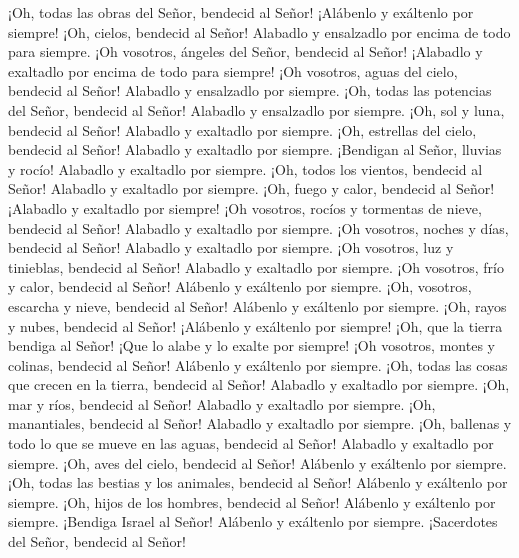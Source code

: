  ¡Oh, todas las obras del Señor, bendecid al Señor!
¡Alábenlo y exáltenlo por siempre!  ¡Oh, cielos, bendecid
al Señor! Alabadlo y ensalzadlo por encima de todo para siempre.
 ¡Oh vosotros, ángeles del Señor, bendecid al Señor!
¡Alabadlo y exaltadlo por encima de todo para siempre! 
¡Oh vosotros, aguas del cielo, bendecid al Señor! Alabadlo y ensalzadlo
por siempre.  ¡Oh, todas las potencias del Señor,
bendecid al Señor! Alabadlo y ensalzadlo por siempre. 
¡Oh, sol y luna, bendecid al Señor! Alabadlo y exaltadlo por siempre.
 ¡Oh, estrellas del cielo, bendecid al Señor! Alabadlo y
exaltadlo por siempre.  ¡Bendigan al Señor, lluvias y
rocío! Alabadlo y exaltadlo por siempre.  ¡Oh, todos los
vientos, bendecid al Señor! Alabadlo y exaltadlo por siempre.
 ¡Oh, fuego y calor, bendecid al Señor! ¡Alabadlo y
exaltadlo por siempre!  ¡Oh vosotros, rocíos y tormentas
de nieve, bendecid al Señor! Alabadlo y exaltadlo por siempre.
 ¡Oh vosotros, noches y días, bendecid al Señor! Alabadlo
y exaltadlo por siempre.  ¡Oh vosotros, luz y tinieblas,
bendecid al Señor! Alabadlo y exaltadlo por siempre.  ¡Oh
vosotros, frío y calor, bendecid al Señor! Alábenlo y exáltenlo por
siempre.  ¡Oh, vosotros, escarcha y nieve, bendecid al
Señor! Alábenlo y exáltenlo por siempre.  ¡Oh, rayos y
nubes, bendecid al Señor! ¡Alábenlo y exáltenlo por siempre!
 ¡Oh, que la tierra bendiga al Señor! ¡Que lo alabe y lo
exalte por siempre!  ¡Oh vosotros, montes y colinas,
bendecid al Señor! Alábenlo y exáltenlo por siempre. 
¡Oh, todas las cosas que crecen en la tierra, bendecid al Señor!
Alabadlo y exaltadlo por siempre.  ¡Oh, mar y ríos,
bendecid al Señor! Alabadlo y exaltadlo por siempre. 
¡Oh, manantiales, bendecid al Señor! Alabadlo y exaltadlo por siempre.
 ¡Oh, ballenas y todo lo que se mueve en las aguas,
bendecid al Señor! Alabadlo y exaltadlo por siempre. 
¡Oh, aves del cielo, bendecid al Señor! Alábenlo y exáltenlo por
siempre.  ¡Oh, todas las bestias y los animales, bendecid
al Señor! Alábenlo y exáltenlo por siempre.  ¡Oh, hijos
de los hombres, bendecid al Señor! Alábenlo y exáltenlo por siempre.
 ¡Bendiga Israel al Señor! Alábenlo y exáltenlo por
siempre.  ¡Sacerdotes del Señor, bendecid al Señor!
